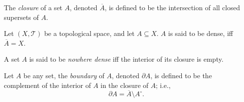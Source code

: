 \begin{definition}
	[closure]
	\label{def: closure}
	The \textit{closure} of a set $A$, denoted $\overline A$, is defined to be the intersection of all closed supersets of $A$.
\end{definition}


\begin{definition}
	\label{def: dense sets}
	Let $(X, \mathcal T)$ be a topological space, and let $A \subseteq X$. $A$ is said to be dense, iff $\overline A = X$.
\end{definition}


\begin{definition}
	\label{def: nowhere dense sets}
	A set $A$ is said to be \textit{nowhere dense} iff the interior of its closure is empty.
\end{definition}


\begin{definition}
	[boundaries]
	\label{def: boundaries}
	Let $A$ be any set, the \textit{boundary} of $A$, denoted $\partial A$, is defined to be the complement of the interior of $A$ in the closure of $A$; i.e.,
	$$
	\partial A = \overline A \setminus A^\circ.
	$$
\end{definition}


